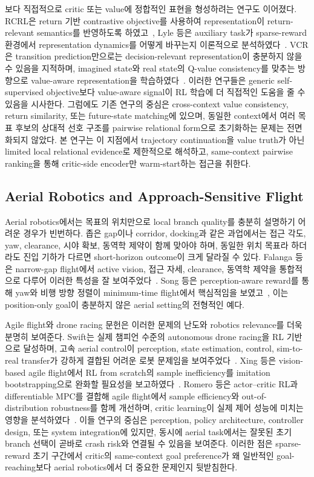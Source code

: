 \documentclass[journal]{IEEEtran}
\begin{document}
보다 직접적으로 critic 또는 value에 정합적인 표현을 형성하려는 연구도 이어졌다. RCRL은 return 기반 contrastive objective를 사용하여 representation이 return-relevant semantics를 반영하도록 하였고~\cite{liu2021rcrl}, Lyle 등은 auxiliary task가 sparse-reward 환경에서 representation dynamics를 어떻게 바꾸는지 이론적으로 분석하였다~\cite{lyle2021aux_rep_dynamics}. VCR은 transition prediction만으로는 decision-relevant representation이 충분하지 않을 수 있음을 지적하며, imagined state와 real state의 Q-value consistency를 맞추는 방향으로 value-aware representation을 학습하였다~\cite{yue2023vcr}. 이러한 연구들은 generic self-supervised objective보다 value-aware signal이 RL 학습에 더 직접적인 도움을 줄 수 있음을 시사한다. 그럼에도 기존 연구의 중심은 cross-context value consistency, return similarity, 또는 future-state matching에 있으며, 동일한 context에서 여러 목표 후보의 상대적 선호 구조를 pairwise relational form으로 초기화하는 문제는 전면화되지 않았다. 본 연구는 이 지점에서 trajectory continuation을 value truth가 아닌 limited local relational evidence로 제한적으로 해석하고, same-context pairwise ranking을 통해 critic-side encoder만 warm-start하는 접근을 취한다.

\subsection{Aerial Robotics and Approach-Sensitive Flight}
Aerial robotics에서는 목표의 위치만으로 local branch quality를 충분히 설명하기 어려운 경우가 빈번하다. 좁은 gap이나 corridor, docking과 같은 과업에서는 접근 각도, yaw, clearance, 시야 확보, 동역학 제약이 함께 맞아야 하며, 동일한 위치 목표라 하더라도 진입 기하가 다르면 short-horizon outcome이 크게 달라질 수 있다. Falanga 등은 narrow-gap flight에서 active vision, 접근 자세, clearance, 동역학 제약을 통합적으로 다루어 이러한 특성을 잘 보여주었다~\cite{falanga2017narrow_gaps}. Song 등은 perception-aware reward를 통해 yaw와 비행 방향 정렬이 minimum-time flight에서 핵심적임을 보였고~\cite{song2023cluttered_flight}, 이는 position-only goal이 충분하지 않은 aerial setting의 전형적인 예다.

Agile flight와 drone racing 문헌은 이러한 문제의 난도와 robotics relevance를 더욱 분명히 보여준다. Swift는 실제 챔피언 수준의 autonomous drone racing을 RL 기반으로 달성하며, 고속 aerial control이 perception, state estimation, control, sim-to-real transfer가 강하게 결합된 어려운 로봇 문제임을 보여주었다~\cite{kaufmann2023swift}. Xing 등은 vision-based agile flight에서 RL from scratch의 sample inefficiency를 imitation bootstrapping으로 완화할 필요성을 보고하였다~\cite{xing2024bootstrap_rl_agile}. Romero 등은 actor--critic RL과 differentiable MPC를 결합해 agile flight에서 sample efficiency와 out-of-distribution robustness를 함께 개선하며, critic learning이 실제 제어 성능에 미치는 영향을 분석하였다~\cite{romero2025acmpc}. 이들 연구의 중심은 perception, policy architecture, controller design, 또는 system integration에 있지만, 동시에 aerial task에서는 잘못된 초기 branch 선택이 곧바로 crash risk와 연결될 수 있음을 보여준다. 이러한 점은 sparse-reward 초기 구간에서 critic의 same-context goal preference가 왜 일반적인 goal-reaching보다 aerial robotics에서 더 중요한 문제인지 뒷받침한다.
\end{document}
